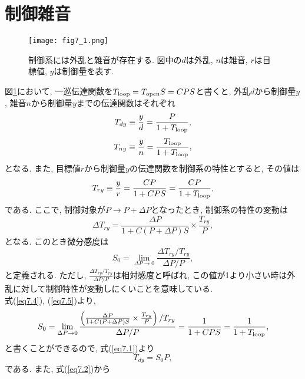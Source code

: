 \section{制御雑音}
\begin{figure}[H]
\begin{center}
\texttt{[image: fig7\_1.png]}
\caption[制御雑音]{制御系には外乱と雑音が存在する. 図中の$d$は外乱, $n$は雑音, $r$は目標値, $y$は制御量を表す. }
\label{fig7.1}
\end{center}
\end{figure}
図\ref{fig7.1}において, 一巡伝達関数を$T_{\rm loop}=T_{\rm open}S=CPS$と書くと, 外乱$d$から制御量$y$, 雑音$n$から制御量$y$までの伝達関数はそれぞれ
\begin{equation}
T_{dy}\equiv\frac{y}{d}=\frac{P}{1+T_{\rm loop}}, 
\label{eq7.1}
\end{equation}
\begin{equation}
T_{ny}\equiv\frac{y}{n}=\frac{T_{\rm loop}}{1+T_{\rm loop}}, 
\label{eq7.2}
\end{equation}
となる. また, 目標値$r$から制御量$y$の伝達関数を制御系の特性とすると, その値は
\begin{equation}
T_{ry}\equiv\frac{y}{r}=\frac{CP}{1+CPS}=\frac{CP}{1+T_{\rm loop}}, 
\end{equation}
である. ここで, 制御対象が$P\rightarrow P+\Delta P$となったとき, 制御系の特性の変動は
\begin{equation}
\Delta T_{ry}=\frac{\Delta P}{1+C(P+\Delta P)S}\times\frac{T_{ry}}{P}, 
\label{eq7.4}
\end{equation}
となる. このとき微分感度は
\begin{equation}
S_0=\lim_{\Delta P\rightarrow 0}\frac{\Delta T_{ry} / T_{ry}}{\Delta P / P}, 
\label{eq7.5}
\end{equation}
と定義される. ただし, $\frac{\Delta T_{ry} / T_{ry}}{\Delta P / P}$は相対感度と呼ばれ, この値が1より小さい時は外乱に対して制御特性が変動しにくいことを意味している. \\
\quad 式(\ref{eq7.4}), (\ref{eq7.5})より, 
\begin{equation}
S_0=\lim_{\Delta P\rightarrow 0}\frac{\left(\frac{\Delta P}{1+C(P+\Delta P)S}\times\frac{T_{ry}}{P}\right) / T_{ry}}{\Delta P / P}=\frac{1}{1+CPS}=\frac{1}{1+T_{\rm loop}}, 
\label{eq7.6}
\end{equation}
と書くことができるので, 式(\ref{eq7.1})より
\begin{equation}
T_{dy}=S_0P, 
\label{eq7.7}
\end{equation}
である. また, 式(\ref{eq7.2})から
